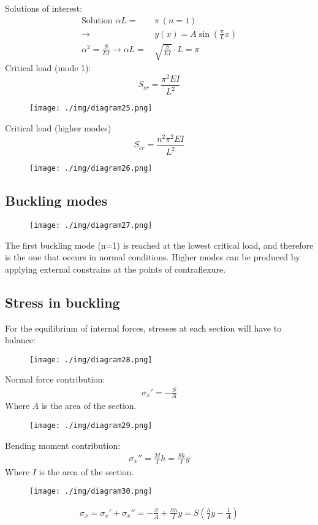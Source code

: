Solutions of interest:
\begin{align}
  \textrm{Solution } \alpha L =\,                  & \pi \, \left(n=1\right)                 \\
  \rightarrow \,                                   & y(x) = A\sin\left(\frac{\pi}{L}x\right) \\
  \alpha^2 = \frac{S}{EI} \rightarrow \alpha L =\, & \sqrt{\frac{S}{EI}}\cdot L = \pi
\end{align}
Critical load (mode 1):
\begin{equation}
  S_{cr} = \frac{\pi^2 EI}{L^2}
\end{equation}
\begin{figure}[H]
  \centering
  \texttt{[image: ./img/diagram25.png]}
  \caption{}
\end{figure}
Critical load (higher modes)
\begin{equation}
  S_{cr} = \frac{n^2 \pi^2 EI}{L^2}
\end{equation}
\begin{figure}[H]
  \centering
  \texttt{[image: ./img/diagram26.png]}
  \caption{}
\end{figure}
\subsection{Buckling modes}
\begin{figure}[H]
  \centering
  \texttt{[image: ./img/diagram27.png]}
  \caption{}
\end{figure}
The first buckling mode (n=1) is reached at the lowest critical load, and therefore is the one that occurs in normal conditions. Higher modes can be produced by applying external constrains at the points of contraflexure.
\subsection{Stress in buckling}
For the equilibrium of internal forces, stresses at each section will have to balance:
\begin{figure}[H]
  \centering
  \texttt{[image: ./img/diagram28.png]}
  \caption{}
\end{figure}
Normal force contribution:
\begin{align}
  \sigma_x' = -\frac{S}{A}
\end{align}
Where $A$ is the area of the section.
\begin{figure}[H]
  \centering
  \texttt{[image: ./img/diagram29.png]}
  \caption{}
\end{figure}
Bending moment contribution:
\begin{align}
  \sigma_x'' = \frac{M}{I}h = \frac{Sh}{I}y
\end{align}
Where $I$ is the area of the section.
\begin{figure}[H]
  \centering
  \texttt{[image: ./img/diagram30.png]}
  \caption{}
\end{figure}
\begin{align}
  \sigma_x = \sigma_x' + \sigma_x''= -\frac{S}{A} + \frac{Sh}{I}y = S\left(\frac{h}{I}y - \frac{1}{A}\right)
\end{align}
